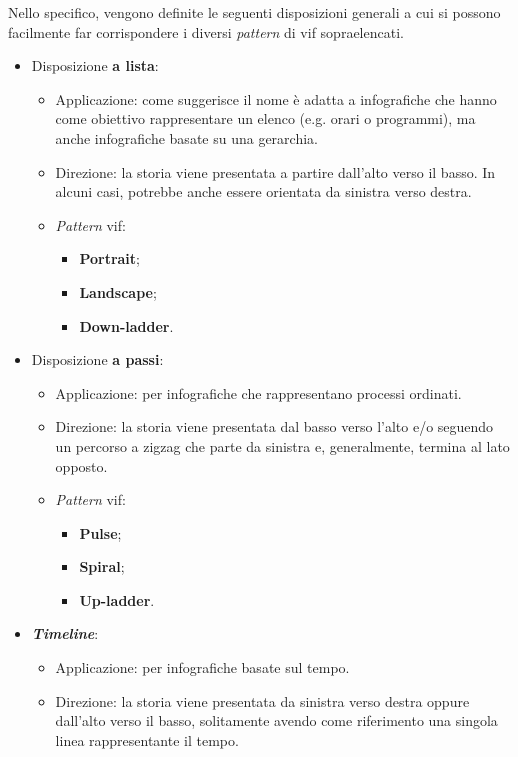 Nello specifico, vengono definite le seguenti disposizioni generali a cui si possono facilmente far corrispondere i diversi \emph{pattern} di \gls{vif} sopraelencati. 
\begin{itemize}
    \item Disposizione \textbf{a lista}:
    \begin{itemize}
        \item Applicazione: come suggerisce il nome è adatta a infografiche che hanno come obiettivo rappresentare un elenco (e.g. orari o programmi), ma 
        anche infografiche basate su una gerarchia.
        \item Direzione: la storia viene presentata a partire dall'alto verso il basso. In alcuni casi, potrebbe anche essere orientata da sinistra verso destra.
        \item \emph{Pattern} \gls{vif}:
        \begin{itemize}
            \item \textbf{Portrait};
            \item \textbf{Landscape};
            \item \textbf{Down-ladder}. 
        \end{itemize}
    \end{itemize}
    \item Disposizione \textbf{a passi}:
    \begin{itemize}
        \item Applicazione: per infografiche che rappresentano processi ordinati.
        \item Direzione: la storia viene presentata dal basso verso l'alto e/o seguendo un percorso a zigzag che parte da sinistra e, generalmente, termina al lato opposto.
        \item \emph{Pattern} \gls{vif}:
        \begin{itemize}
            \item \textbf{Pulse};
            \item \textbf{Spiral};
            \item \textbf{Up-ladder}. 
        \end{itemize}
    \end{itemize}
    \item \textbf{\emph{Timeline}}:
    \begin{itemize}
        \item Applicazione: per infografiche basate sul tempo.
        \item Direzione: la storia viene presentata da sinistra verso destra oppure dall'alto verso il basso, solitamente avendo come riferimento una singola linea rappresentante il tempo.

\end{itemize}
\end{itemize}
